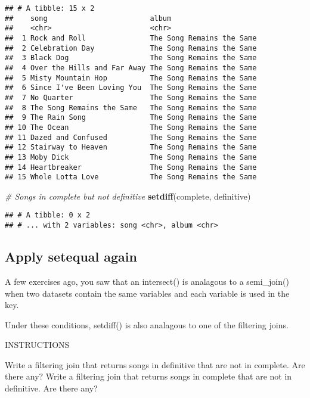 \documentclass[]{article}
\newenvironment{Shaded}{\begin{snugshade}}{\end{snugshade}}
\newcommand{\KeywordTok}[1]{\textcolor[rgb]{0.13,0.29,0.53}{\textbf{#1}}}
\newcommand{\CommentTok}[1]{\textcolor[rgb]{0.56,0.35,0.01}{\textit{#1}}}
\newcommand{\NormalTok}[1]{#1}
\begin{document}
\begin{verbatim}
## # A tibble: 15 x 2
##    song                        album                    
##    <chr>                       <chr>                    
##  1 Rock and Roll               The Song Remains the Same
##  2 Celebration Day             The Song Remains the Same
##  3 Black Dog                   The Song Remains the Same
##  4 Over the Hills and Far Away The Song Remains the Same
##  5 Misty Mountain Hop          The Song Remains the Same
##  6 Since I've Been Loving You  The Song Remains the Same
##  7 No Quarter                  The Song Remains the Same
##  8 The Song Remains the Same   The Song Remains the Same
##  9 The Rain Song               The Song Remains the Same
## 10 The Ocean                   The Song Remains the Same
## 11 Dazed and Confused          The Song Remains the Same
## 12 Stairway to Heaven          The Song Remains the Same
## 13 Moby Dick                   The Song Remains the Same
## 14 Heartbreaker                The Song Remains the Same
## 15 Whole Lotta Love            The Song Remains the Same
\end{verbatim}

\begin{Shaded}
\begin{Highlighting}[]
\CommentTok{# Songs in complete but not definitive}
\KeywordTok{setdiff}\NormalTok{(complete, definitive)}
\end{Highlighting}
\end{Shaded}

\begin{verbatim}
## # A tibble: 0 x 2
## # ... with 2 variables: song <chr>, album <chr>
\end{verbatim}

\subsection{Apply setequal again}\label{apply-setequal-again}

A few exercises ago, you saw that an intersect() is analagous to a
semi\_join() when two datasets contain the same variables and each
variable is used in the key.

Under these conditions, setdiff() is also analagous to one of the
filtering joins.

INSTRUCTIONS

Write a filtering join that returns songs in definitive that are not in
complete. Are there any? Write a filtering join that returns songs in
complete that are not in definitive. Are there any?
\end{document}
